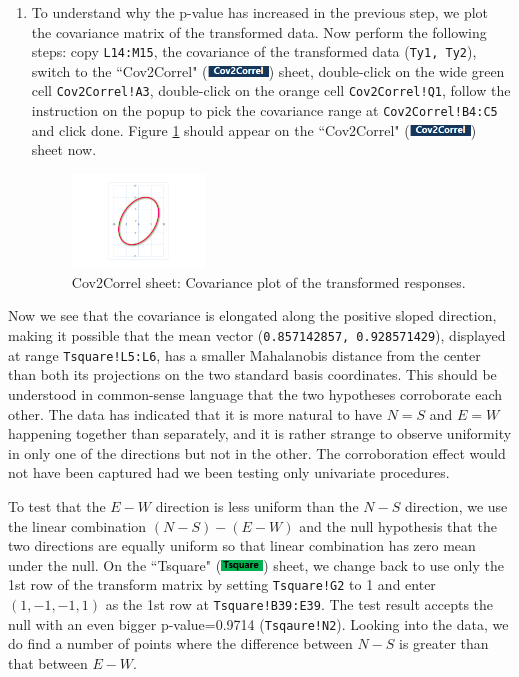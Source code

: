 \documentclass[article]{jss}
\newcommand{\shtTsquare}{``Tsquare" (\includegraphics[height=8pt, keepaspectratio=true]{TsquareSheetTab_png}) }
\newcommand{\shtCovCorrel}{``Cov2Correl" (\includegraphics[height=8pt, keepaspectratio=true]{Cov2CorrelSheetTab_png}) }
\begin{document}
\begin{enumerate}
                \item To understand why the p-value has increased in the previous step, we plot the covariance matrix of the transformed data. Now perform the following steps: copy \texttt{L14:M15}, the covariance of the transformed data (\texttt{Ty1, Ty2}), switch to the \shtCovCorrel sheet, double-click on the wide green cell \texttt{Cov2Correl!A3}, double-click on the orange cell \texttt{Cov2Correl!Q1}, follow the instruction on the popup to pick the covariance range at \texttt{Cov2Correl!B4:C5} and click done. Figure \ref{fig:Cov2Correl_PlotCov} should appear on the \shtCovCorrel sheet now.
                
                \begin{figure}[!tbh]
                        \includegraphics[width=100pt,keepaspectratio=true]{img/Cov2Correl_PlotCov}
                        \vspace{-10pt}\centering\protect\caption{Cov2Correl sheet: Covariance plot of the transformed responses.}\label{fig:Cov2Correl_PlotCov}
                \end{figure}
                
        \end{enumerate}
        
        Now we see that the covariance is elongated along the positive sloped direction, making it possible that the mean vector (\texttt{0.857142857, 0.928571429}), displayed at range \texttt{Tsquare!L5:L6}, has a smaller Mahalanobis distance from the center than both its projections on the two standard basis coordinates. This should be understood in common-sense language that the two hypotheses corroborate each other. The data has indicated that it is more natural to have $N=S$ and $E=W$ happening together than separately, and it is rather strange to observe uniformity in only one of the directions but not in the other. The corroboration effect would not have been captured had we been testing only univariate procedures.
        
        
        To test that the $E-W$ direction is less uniform than the $N-S$ direction, we use the linear combination $(N-S)-(E-W)$ and the null hypothesis that the two directions are equally uniform so that linear combination has zero mean under the null. On the \shtTsquare sheet, we change back to use only the 1st row of the transform matrix by setting \texttt{Tsquare!G2} to 1 and enter $(1,-1,-1,1)$ as the 1st row at \texttt{Tsquare!B39:E39}. The test result accepts the null with an even bigger p-value=0.9714 (\texttt{Tsqaure!N2}). Looking into the data, we do find a number of points where the difference between $N-S$ is greater than that between $E-W$.
        
\end{document}
